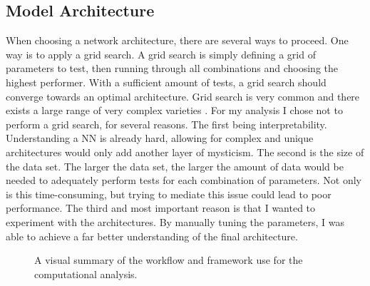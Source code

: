 \subsection{Model Architecture}\label{subsec:arch}
When choosing a network architecture, there are several ways to proceed. One way is to apply a grid search.
A grid search is simply defining a grid of parameters to test, then running through all combinations and 
choosing the highest performer. With a sufficient amount of tests, a grid search should converge towards 
an optimal architecture. Grid search is very common and there exists a large range of very complex varieties \cite{GS}.
For my analysis I chose not to perform a grid search, for several reasons. The first being interpretability.
Understanding a \ac{NN} is already hard, allowing for complex and unique architectures would only add another layer
of mysticism. The second is the size of the data set. The larger the data set, the larger the amount of data 
would be needed to adequately perform tests for each combination of parameters. Not only is this time-consuming,
but trying to mediate this issue could lead to poor performance. The third and most important reason is that 
I wanted to experiment with the architectures. By manually tuning the parameters, I was able to achieve a far 
better understanding of the final architecture. 
\begin{figure}
    \caption{A visual summary of the workflow and framework use for the 
    computational analysis. }
    \label{fig:arch}
\end{figure}
